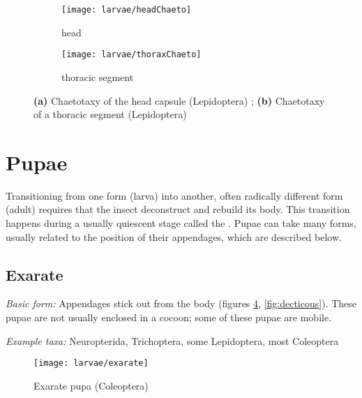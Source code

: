 \begin{figure}[ht!]
    \centering
    \begin{subfigure}[ht!]{0.65\textwidth}
      \centering
        \texttt{[image: larvae/headChaeto]}
        \caption{head}
        \label{fig:headchaeto}
    \end{subfigure}
    \hfill
    \begin{subfigure}[ht!]{0.25\textwidth}
        \texttt{[image: larvae/thoraxChaeto]}
        \caption{thoracic segment}
        \label{fig:thoraxchaeto}
    \end{subfigure}
    \caption{\textbf{(a)} Chaetotaxy of the head capsule (Lepidoptera) \citep[redrawn and modified from][Fig. 26.1]{stehr1987immature}; \textbf{(b)} Chaetotaxy of a thoracic segment (Lepidoptera) \citep[redrawn and modified from][Fig. 26.21]{stehr1987immature}}\label{fig:chaeto}
\end{figure}%

\section{Pupae}%
Transitioning from one form (larva) into another, often radically different form (adult) requires that the insect deconstruct and rebuild its body. This transition happens during a usually quiescent stage called the . Pupae can take many forms, usually related to the position of their appendages, which are described below.

\subsection{Exarate}
\noindent{}\textit{Basic form:} Appendages stick out from the body (figures \ref{fig:exarate}, \ref{fig:decticous}). These pupae are not usually enclosed in a cocoon; some of these pupae are mobile.\vspace{3mm}

\noindent{}\textit{Example taxa:} Neuropterida, Trichoptera, some Lepidoptera, most Coleoptera\vspace{3mm}

\begin{figure}[ht!]
  \centering
    \texttt{[image: larvae/exarate]}
  \caption{Exarate pupa (Coleoptera) \citep[redrawn from][Fig. 2]{bhlpart193556}}
  \label{fig:exarate}
\end{figure}

